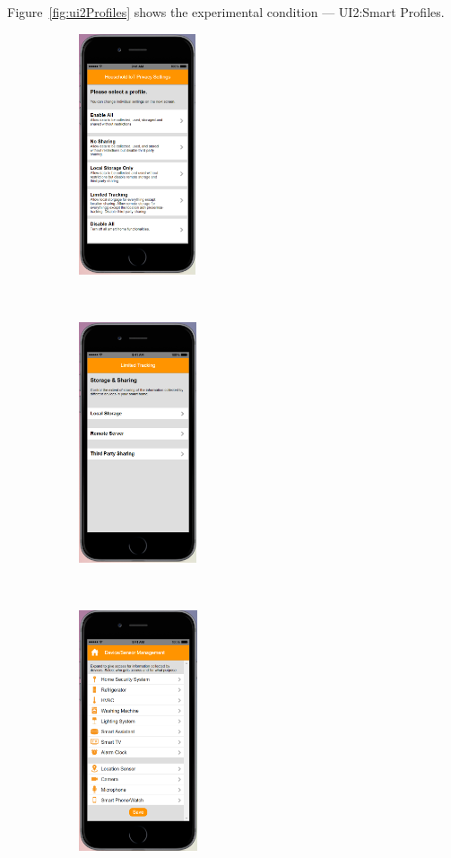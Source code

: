 Figure~\ref{fig:ui2Profiles} shows the experimental condition --- UI2:Smart Profiles.
\begin{figure}[htb]
	\centering
	\begin{subfigure}[t]{0.2\textwidth}
		\centering
		\includegraphics[height=2.8in]{figures/ui2sp1.png}
	\end{subfigure}%
	~~~~~
	\begin{subfigure}[t]{0.2\textwidth}
		\centering
		\includegraphics[height=2.8in]{figures/ui2sp2.png}
	\end{subfigure}%
	~~~~~
	\begin{subfigure}[t]{0.2\textwidth}
		\centering
		\includegraphics[height=2.8in]{figures/ui1sp3.png}

\end{subfigure}
\end{figure}
